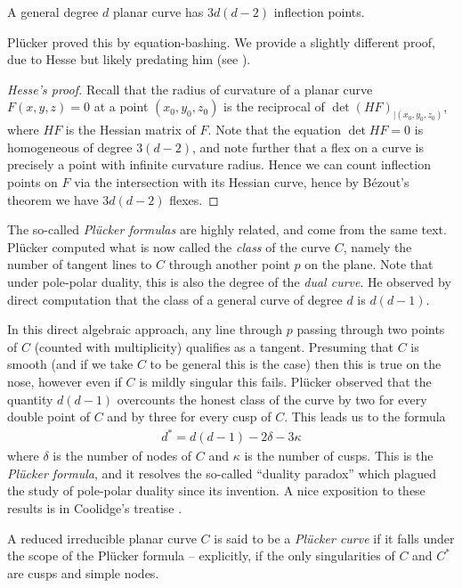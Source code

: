 \documentclass[11pt]{amsart}
\begin{document}
\begin{theorem}[Pl\"ucker, 1835] A general degree $d$ planar curve has $3d(d-2)$ inflection points.
\end{theorem}
Pl\"{u}cker proved this by equation-bashing. We provide a slightly different proof, due to Hesse but likely predating him (see \cite[p.~169]{Gray-worlds}).

\begin{proof}[Hesse's proof]
Recall that the radius of curvature of a planar curve $F(x,y,z)=0$ at a point $(x_0,y_0,z_0)$ is the reciprocal of $\det(HF)_{|(x_0,y_0,z_0)}$, where $HF$ is the Hessian matrix of $F$. Note that the equation $\det HF=0$ is homogeneous of degree $3(d-2)$, and note further that a flex on a curve is precisely a point with infinite curvature radius. Hence we can count inflection points on $F$ via the intersection with its Hessian curve, hence by B\'{e}zout's theorem we have $3d(d-2)$ flexes.
\end{proof}

The so-called \textit{Pl\"ucker formulas} are highly related, and come from the same text. Pl\"{u}cker computed what is now called the \textit{class} of the curve $C$, namely the number of tangent lines to $C$ through another point $p$ on the plane. Note that under pole-polar duality, this is also the degree of the \textit{dual curve}. He observed by direct computation that the class of a general curve of degree $d$ is $d(d-1)$.

In this direct algebraic approach, any line through $p$ passing through two points of $C$ (counted with multiplicity) qualifies as a tangent. Presuming that $C$ is smooth (and if we take $C$ to be general this is the case) then this is true on the nose, however even if $C$ is mildly singular this fails. Pl\"{u}cker observed that the quantity $d(d-1)$ overcounts the honest class of the curve by two for every double point of $C$ and by three for every cusp of $C$. This leads us to the formula
\begin{align*}
    d^\ast = d(d-1) - 2\delta - 3\kappa
\end{align*}
where $\delta$ is the number of nodes of $C$ and $\kappa$ is the number of cusps. This is the \textit{Pl\"ucker formula}, and it resolves the so-called ``duality paradox'' which plagued the study of pole-polar duality since its invention. A nice exposition to these results is in Coolidge's treatise \cite[Chapter~VI]{Coolidge}.

\begin{terminology} A reduced irreducible planar curve $C$ is said to be a \textit{Pl\"ucker curve} if it falls under the scope of the Pl\"{u}cker formula -- explicitly, if the only singularities of $C$ and $C^\ast$ are cusps and simple nodes. 
\end{terminology}
\end{document}
